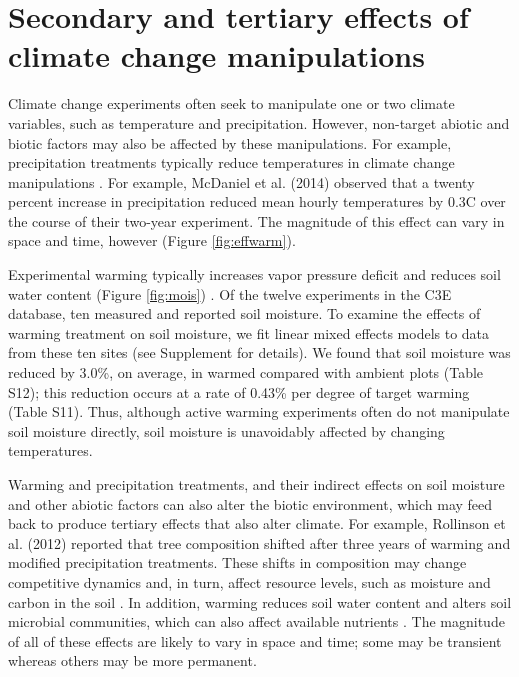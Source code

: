 \documentclass{article}
\begin{document}
\section* {Secondary and tertiary effects of climate change manipulations} 
Climate change experiments often seek to manipulate one or two climate variables, such as temperature and precipitation. However, non-target abiotic and biotic factors may also be affected by these manipulations. For example, precipitation treatments typically reduce temperatures in climate change manipulations \citep{sherry2007,rollinson2012,mcdaniel2014}. For example, McDaniel et al. (2014) observed that a twenty percent increase in precipitation reduced mean hourly temperatures by 0.3\degree C over the course of their two-year experiment. The magnitude of this effect can vary in space and time, however (Figure \ref{fig:effwarm}). 
\par Experimental warming typically increases vapor pressure deficit and reduces soil water content (Figure \ref{fig:mois}) \citep[e.g.,][]{sherry2007,morin2010,templer2016}. Of the twelve experiments in the C3E database, ten measured and reported soil moisture. To examine the effects of warming treatment on soil moisture, we fit linear mixed effects models to data from these ten sites (see Supplement for details). We found that soil moisture was reduced by 3.0\%, on average, in warmed compared with ambient plots (Table S12); this reduction occurs at a rate of 0.43\% per degree of target warming (Table S11). Thus, although active warming experiments often do not manipulate soil moisture directly, soil moisture is unavoidably affected by changing temperatures. 

\par Warming and precipitation treatments, and their indirect effects on soil moisture and other abiotic factors can also alter the biotic environment, which may feed back to produce tertiary effects that also alter climate. For example, Rollinson et al. (2012) reported that tree composition shifted after three years of warming and modified precipitation treatments. These shifts in composition may change competitive dynamics and, in turn, affect resource levels, such as moisture and carbon in the soil \citep{harte2015}. In addition, warming reduces soil water content and alters soil microbial communities, which can also affect available nutrients \citep{mcdaniel2014,mcdaniel2014b}. The magnitude of all of these effects are likely to vary in space and time; some may be transient whereas others may be more permanent.
\end{document}
